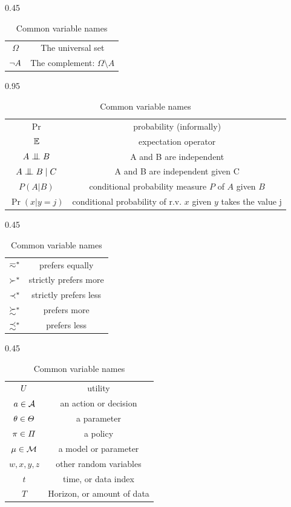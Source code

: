 \begin{table}
\begin{subtable}[h]{0.45\textwidth}
\begin{tabular}{cc}
      $\Omega$ & The universal set\\
      $\neg A$ & The complement: $\Omega \setminus A$\\\hline
    \end{tabular}
    \caption{Sets}
  \end{subtable}
  \begin{subtable}[t]{0.95\textwidth}
    \begin{tabular}{cc}
      \hline  
      $\Pr$ & probability (informally)\\
      $\mathop{\mbox{\ensuremath{\mathbb{E}}}}\nolimits$ & expectation operator\\
      $A \indep B$  & A and B are independent\\
      $A \indep B \mid C $  & A and B are independent given C\\
      $P(A | B)$ & conditional probability measure $P$ of $A$ given $B$\\
      $\Pr(x | y=j)$ & conditional probability of r.v. $x$ given $y$ takes the value j\\\hline
    \end{tabular}
    \caption{Probability}
  \end{subtable}
  \begin{subtable}{0.45\textwidth}
    \begin{tabular}{cc}
      \hline  
      $\eqsim^*$ & prefers equally\\
      $\succ^*$ & strictly prefers more\\
      $\prec^*$ & strictly prefers less\\
      $\succsim^*$ & prefers more \\
      $\precsim^*$ & prefers less\\\hline
    \end{tabular}
    \caption{Preferences}
  \end{subtable}
  \begin{subtable}{0.45\textwidth}
    \begin{tabular}{cc}
      \hline  
      $U$ & utility\\
      $a \in {\mathcal{A}}$ & an action or decision\\
      $\theta \in \Theta$ & a parameter\\
      $\pi \in \Pi$ & a policy \\
      $\mu \in {\mathcal{M}}$ & a model or parameter\\
      $w, x, y, z$ & other random variables\\
      $t$ & time, or data index\\
      $T$ & Horizon, or amount of data\\\hline
    \end{tabular}
    \caption{Common variable names}
  \end{subtable}
\end{table}

